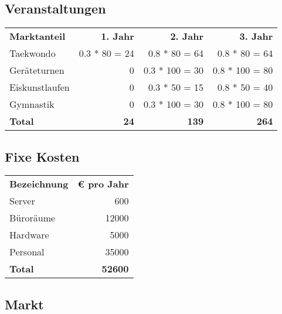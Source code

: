 \subsection{Veranstaltungen}

\begin{table}[H]

    \begin{tabular}{l r r r}
        \textbf{Marktanteil}	& \textbf{1. Jahr}  & \textbf{2. Jahr}  & \textbf{3. Jahr} \\
        Taekwondo               & 0.3 * 80 = 24     & 0.8 *  80 = 64    & 0.8 *  80 = 64\\
        Geräteturnen            & 0                 & 0.3 * 100 = 30    & 0.8 * 100 = 80\\
        Eiskunstlaufen          & 0                 & 0.3 *  50 = 15    & 0.8 *  50 = 40\\
        Gymnastik               & 0                 & 0.3 * 100 = 30    & 0.8 * 100 = 80\\
        \midrule
        \textbf{Total}          & \textbf{24}   & \textbf{139}      & \textbf{264}
    \end{tabular}
    \label{tab:veranstaltungen}
\end{table}



\subsection{Fixe Kosten}

\begin{table}[H]

    \begin{tabular}{l r}
        \textbf{Bezeichnung}    & \textbf{€ pro Jahr}\\
        Server                  & 600\\
        Büroräume               & 12000\\
        Hardware                & 5000\\
        Personal                & 35000\\
        \midrule
        \textbf{Total}          & \textbf{52600}
    \end{tabular}
    \label{tab:Fixkosten}
\end{table}

\subsection{Markt}

